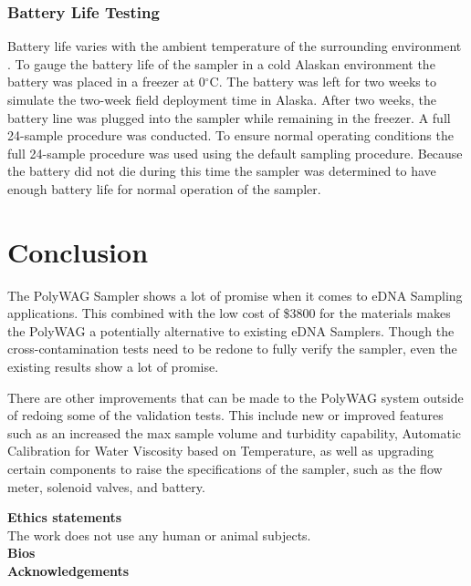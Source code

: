 \documentclass[11pt, letterpaper]{article}
\begin{document}
\subsubsection{Battery Life Testing}
Battery life varies with the ambient temperature of the surrounding environment \cite{art:Battery}. To gauge the battery life of the sampler in a cold Alaskan environment the battery was placed in a freezer at 0$^\circ$C. The battery was left for two weeks to simulate the two-week field deployment time in Alaska. After two weeks, the battery line was plugged into the sampler while remaining in the freezer. A full 24-sample procedure was conducted. To ensure normal operating conditions the full 24-sample procedure was used using the default sampling procedure. Because the battery did not die during this time the sampler was determined to have enough battery life for normal operation of the sampler.


\section{Conclusion}

The PolyWAG Sampler shows a lot of promise when it comes to eDNA Sampling applications. This combined with the low cost of \$3800 for the materials makes the PolyWAG a potentially alternative to existing eDNA Samplers. Though the cross-contamination tests need to be redone to fully verify the sampler, even the existing results show a lot of promise. 
\newline\par\noindent
There are other improvements that can be made to the PolyWAG system outside of redoing some of the validation tests. This include new or improved features such as an increased the max sample volume and turbidity capability, Automatic Calibration for Water Viscosity based on Temperature, as well as upgrading certain components to raise the specifications of the sampler, such as the flow meter, solenoid valves, and battery. 


\par\noindent\newline
\textbf{Ethics statements}\\
\noindent
The work does not use any human or animal subjects.\\


\noindent
\textbf{Bios}\\


\noindent
\textbf{Acknowledgements}\\
\end{document}
